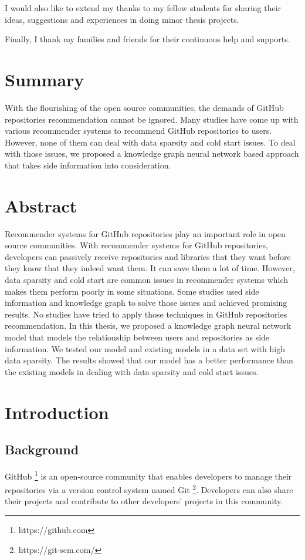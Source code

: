 \documentclass[11pt,twoside]{report}
\begin{document}
I would also like to extend my thanks to my fellow students for sharing their ideas, suggestions and experiences in doing minor thesis projects.

Finally, I thank my families and friends for their continuous help and supports.

\chapter*{Summary}
With the flourishing of the open source communities, the demands of GitHub repositories recommendation cannot be ignored. Many studies have come up with various recommender systems to recommend GitHub repositories to users. However, none of them can deal with data sparsity and cold start issues. To deal with those issues, we proposed a knowledge graph neural network based approach that takes side information into consideration.

\chapter*{Abstract}
Recommender systems for GitHub repositories play an important role in open source communities. With recommender systems for GitHub repositories, developers can passively receive repositories and libraries that they want before they know that they indeed want them. It can save them a lot of time. However, data sparsity and cold start are common issues in recommender systems which makes them perform poorly in some situations. Some studies used side information and knowledge graph to solve those issues and achieved promising results. No studies have tried to apply those techniques in GitHub repositories recommendation. In this thesis, we proposed a knowledge graph neural network model that models the relationship between users and repositories as side information. We tested our model and existing models in a data set with high data sparsity. The results showed that our model has a better performance than the existing models in dealing with data sparsity and cold start issues.

{
    \hypersetup{linkcolor=black}
    \tableofcontents
    \listoffigures
    \listoftables
}


\chapter{Introduction}
\section{Background}
GitHub \footnote{https://github.com} is an open-source community that enables developers to manage their repositories via a version control system named Git \footnote{https://git-scm.com/}. Developers can also share their projects and contribute to other developers’ projects in this community.
\end{document}
